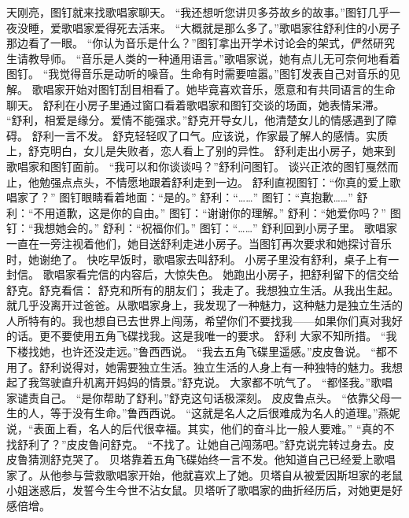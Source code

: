 \documentclass[a4paper,12pt,UTF8,twoside]{ctexbook}
\begin{document}
        天刚亮，图钉就来找歌唱家聊天。  
        “我还想听您讲贝多芬故乡的故事。”图钉几乎一夜没睡，爱歌唱家爱得死去活来。  
        “大概就是那么多了。”歌唱家往舒利住的小房子那边看了一眼。  
        “你认为音乐是什么？”图钉拿出开学术讨论会的架式，俨然研究生请教导师。  
        “音乐是人类的一种通用语言。”歌唱家说，她有点儿无可奈何地看着图钉。  
        “我觉得音乐是动听的噪音。生命有时需要喧嚣。”图钉发表自己对音乐的见解。  
        歌唱家开始对图钉刮目相看了。她毕竟喜欢音乐，愿意和有共同语言的生命聊天。  
        舒利在小房子里通过窗口看着歌唱家和图钉交谈的场面，她表情呆滞。  
        “舒利，相爱是缘分。爱情不能强求。”舒克开导女儿，他清楚女儿的情感遇到了障碍。  
        舒利一言不发。  
        舒克轻轻叹了口气。应该说，作家最了解人的感情。实质上，舒克明白，女儿是失败者，恋人看上了别的异性。  
        舒利走出小房子，她来到歌唱家和图钉面前。  
        “我可以和你谈谈吗？”舒利问图钉。  
        谈兴正浓的图钉戛然而止，他勉强点点头，不情愿地跟着舒利走到一边。  
        舒利直视图钉：“你真的爱上歌唱家了？”  
        图钉眼睛看着地面：“是的。”  
        舒利：“……”  
        图钉：“真抱歉……”  
        舒利：“不用道歉，这是你的自由。”        
        图钉：“谢谢你的理解。”  
        舒利：“她爱你吗？”  
        图钉：“我想她会的。”  
        舒利：“祝福你们。”  
        图钉：“……”  
        舒利回到小房子里。  
        歌唱家一直在一旁注视着他们，她目送舒利走进小房子。当图钉再次要求和她探讨音乐时，她谢绝了。  
        快吃早饭时，歌唱家去叫舒利。  
        小房子里没有舒利，桌子上有一封信。  
        歌唱家看完信的内容后，大惊失色。  
        她跑出小房子，把舒利留下的信交给舒克。舒克看信：    
        舒克和所有的朋友们；  
        我走了。我想独立生活。从我出生起。就几乎没离开过爸爸。从歌唱家身上，我发现了一种魅力，这种魅力是独立生活的人所特有的。我也想自已去世界上闯荡，希望你们不要找我——如果你们真对我好的话。更不要使用五角飞碟找我。这是我唯一的要求。  
        舒利    
        大家不知所措。        
        “我下楼找她，也许还没走远。”鲁西西说。  
        “我去五角飞碟里遥感。”皮皮鲁说。  
        “都不用了。舒利说得对，她需要独立生活。独立生活的人身上有一种独特的魅力。我想起了我驾驶直升机离开妈妈的情景。”舒克说。  
        大家都不吭气了。  
        “都怪我。”歌唱家谴责自己。  
        “是你帮助了舒利。”舒克这句话极深刻。  
        皮皮鲁点头。  
        “依靠父母一生的人，等于没有生命。”鲁西西说。  
        “这就是名人之后很难成为名人的道理。”燕妮说，“表面上看，名人的后代很幸福。其实，他们的奋斗比一般人要难。”  
        “真的不找舒利了？”皮皮鲁问舒克。  
        “不找了。让她自己闯荡吧。”舒克说完转过身去。皮皮鲁猜测舒克哭了。  
        贝塔靠着五角飞碟始终一言不发。他知道自己已经爱上歌唱家了。从他参与营救歌唱家开始，他就喜欢上了她。贝塔自从被爱因斯坦家的老鼠小姐迷惑后，发誓今生今世不沾女鼠。贝塔听了歌唱家的曲折经历后，对她更是好感倍增。  
\end{document}
